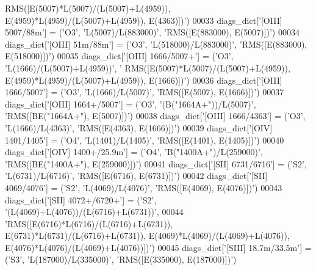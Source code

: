 \begin{DoxyCode}
{      RMS([E(5007)*L(5007)/(L(5007)+L(4959)), E(4959)*L(4959)/(L(5007)+L(4959)), E(4363)])'})
00033 diags\_dict[\textcolor{stringliteral}{'[OIII] 5007/88m'}] = (\textcolor{stringliteral}{'O3'}, \textcolor{stringliteral}{'L(5007)/L(883000)'}, \textcolor{stringliteral}{'RMS([E(883000), E(5007)])'})
00034 diags\_dict[\textcolor{stringliteral}{'[OIII] 51m/88m'}] = (\textcolor{stringliteral}{'O3'}, \textcolor{stringliteral}{'L(518000)/L(883000)'}, \textcolor{stringliteral}{'RMS([E(883000), E(518000)])'})
00035 diags\_dict[\textcolor{stringliteral}{'[OIII] 1666/5007+'}] = (\textcolor{stringliteral}{'O3'}, \textcolor{stringliteral}{'L(1666)/(L(5007)+L(4959))'}, \textcolor{stringliteral}{'
      RMS([E(5007)*L(5007)/(L(5007)+L(4959)), E(4959)*L(4959)/(L(5007)+L(4959)), E(1666)])'})
00036 diags\_dict[\textcolor{stringliteral}{'[OIII] 1666/5007'}] = (\textcolor{stringliteral}{'O3'}, \textcolor{stringliteral}{'L(1666)/L(5007)'}, \textcolor{stringliteral}{'RMS([E(5007), E(1666)])'})
00037 diags\_dict[\textcolor{stringliteral}{'[OIII] 1664+/5007'}] = (\textcolor{stringliteral}{'O3'}, \textcolor{stringliteral}{'(B("1664A+"))/L(5007)'}, \textcolor{stringliteral}{'RMS([BE("1664A+"), E(5007)])'})
00038 diags\_dict[\textcolor{stringliteral}{'[OIII] 1666/4363'}] = (\textcolor{stringliteral}{'O3'}, \textcolor{stringliteral}{'L(1666)/L(4363)'}, \textcolor{stringliteral}{'RMS([E(4363), E(1666)])'})
00039 diags\_dict[\textcolor{stringliteral}{'[OIV] 1401/1405'}] = (\textcolor{stringliteral}{'O4'}, \textcolor{stringliteral}{'L(1401)/L(1405)'}, \textcolor{stringliteral}{'RMS([E(1401), E(1405)])'})
00040 diags\_dict[\textcolor{stringliteral}{'[OIV] 1400+/25.9m'}] = (\textcolor{stringliteral}{'O4'}, \textcolor{stringliteral}{'B("1400A+")/L(259000)'}, \textcolor{stringliteral}{'RMS([BE("1400A+"), E(259000)])'})
00041 diags\_dict[\textcolor{stringliteral}{'[SII] 6731/6716'}] = (\textcolor{stringliteral}{'S2'}, \textcolor{stringliteral}{'L(6731)/L(6716)'}, \textcolor{stringliteral}{'RMS([E(6716), E(6731)])'})
00042 diags\_dict[\textcolor{stringliteral}{'[SII] 4069/4076'}] = (\textcolor{stringliteral}{'S2'}, \textcolor{stringliteral}{'L(4069)/L(4076)'}, \textcolor{stringliteral}{'RMS([E(4069), E(4076)])'})
00043 diags\_dict[\textcolor{stringliteral}{'[SII] 4072+/6720+'}] = (\textcolor{stringliteral}{'S2'}, \textcolor{stringliteral}{'(L(4069)+L(4076))/(L(6716)+L(6731))'},
00044               \textcolor{stringliteral}{'RMS([E(6716)*L(6716)/(L(6716)+L(6731)), E(6731)*L(6731)/(L(6716)+L(6731)),
       E(4069)*L(4069)/(L(4069)+L(4076)), E(4076)*L(4076)/(L(4069)+L(4076))])'})
00045 diags\_dict[\textcolor{stringliteral}{'[SIII] 18.7m/33.5m'}] = (\textcolor{stringliteral}{'S3'}, \textcolor{stringliteral}{'L(187000)/L(335000)'}, \textcolor{stringliteral}{'RMS([E(335000), E(187000)])'})

\end{DoxyCode}
